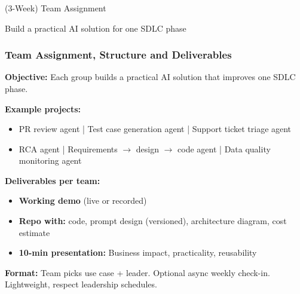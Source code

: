 \begin{frame}[fragile]\frametitle{}
\begin{center}
{\Large (3-Week) Team Assignment}

{\small Build a practical AI solution for one SDLC phase}
\end{center}
\end{frame}

\begin{frame}[fragile]\frametitle{Team Assignment, Structure and Deliverables}
\textbf{Objective:} Each group builds a practical AI solution that improves one SDLC phase.

\textbf{Example projects:}
\begin{itemize}
\item PR review agent | Test case generation agent | Support ticket triage agent
\item RCA agent | Requirements $\rightarrow$ design $\rightarrow$ code agent | Data quality monitoring agent
\end{itemize}

\textbf{Deliverables per team:}
\begin{itemize}
\item \textbf{Working demo} (live or recorded)
\item \textbf{Repo with:} code, prompt design (versioned), architecture diagram, cost estimate
\item \textbf{10-min presentation:} Business impact, practicality, reusability
\end{itemize}

\textbf{Format:} Team picks use case + leader. Optional async weekly check-in. Lightweight, respect leadership schedules.
\end{frame}


